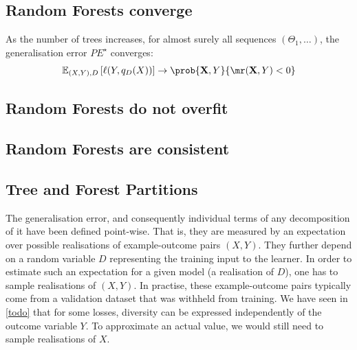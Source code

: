 \documentclass[../main.tex]{subfiles}
\begin{document}
\subsection{Random Forests converge}


As the number of trees increases, for almost surely all sequences $(\Theta_{1}, \dots)$, the generalisation error $PE^\star$ converges:
$$
\mathbb{E}_{(X,Y), D}\left[ \ell(Y, q_{D}(X)) \right]  \to
\prob{\vec{X}, Y}{
\mr(\vec{X}, Y)  < 0
}
$$

\subsection{Random Forests do not overfit}

\subsection{Random Forests are consistent}

\subsection{Tree and Forest Partitions}
\label{sec:tree-and-forest-partitions}

The generalisation error, and consequently individual terms of any decomposition of it have been defined point-wise. That is, they are measured by an expectation over possible realisations of example-outcome pairs $(X,Y)$. They further depend on a random variable $D$ representing the training input to the learner. In order to estimate such an expectation for a given model (a realisation of $D$), one has to sample realisations of $(X,Y)$. In practise, these example-outcome pairs typically come from a validation dataset that was withheld from training.
We have seen in \ref{todo} that for some losses, diversity can be expressed independently of the outcome variable $Y$. 
To approximate an actual value, we would still need to sample realisations of $X$.
\end{document}
